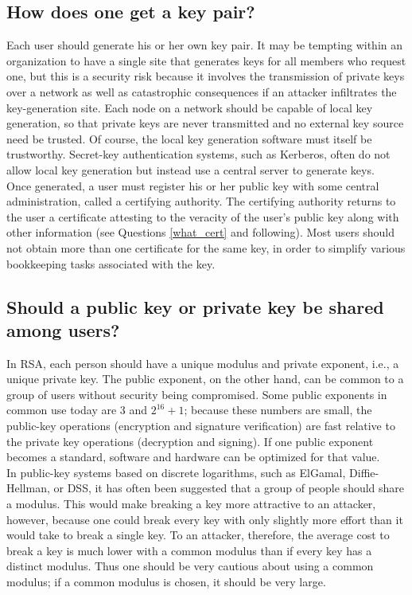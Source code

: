\subsection{How does one get a key pair?}

Each user should generate his or her own key pair. It may be tempting
within an organization to have a single site that generates keys for
all members who request one, but this is a security risk because it
involves the transmission of private keys over a network as well as
catastrophic consequences if an attacker infiltrates the key-generation
site. Each node on a network should be capable of local key generation,
so that private keys are never transmitted and no external key source
need be trusted. Of course, the local key generation software must
itself be trustworthy. Secret-key authentication systems, such as
Kerberos, often do not allow local key generation but instead use a
central server to generate keys.\\

Once generated, a user must register his or her public key with some
central administration, called a certifying authority. The certifying
authority returns to the user a certificate attesting to the veracity of
the user's public key along with other information (see Questions
\ref{what_cert} and following). Most users should not obtain more than one
certificate for the same key, in order to simplify various bookkeeping
tasks associated with the key.

\subsection{Should a public key or private key be shared among users?}

In RSA, each person should have a unique modulus and private exponent,
i.e., a unique private key. The public exponent, on the other hand, can
be common to a group of users without security being compromised. Some
public exponents in common use today are 3 and $2^{16}+1$; because these
numbers are small, the public-key operations (encryption and signature
verification) are fast relative to the private key operations
(decryption and signing). If one public exponent becomes a standard,
software and hardware can be optimized for that value.\\

In public-key systems based on discrete logarithms, such as ElGamal,
Diffie-Hellman, or DSS, it has often been suggested that a group of
people should share a modulus. This would make breaking a key more
attractive to an attacker, however, because one could break every key
with only slightly more effort than it would take to break a single
key. To an attacker, therefore, the average cost to break a key is much
lower with a common modulus than if every key has a distinct modulus.
Thus one should be very cautious about using a common modulus; if a
common modulus is chosen, it should be very large.\\

